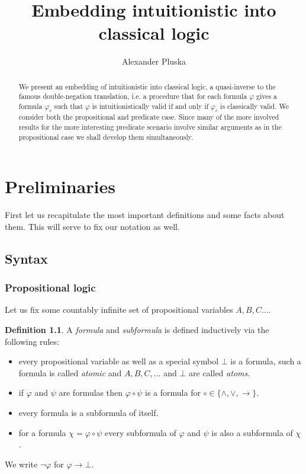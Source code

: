 \documentclass[a4paper,12pt]{report}
\title{Embedding intuitionistic into classical logic}
\author{Alexander Pluska}
\theoremstyle{definition}
\theoremstyle{definition}
\theoremstyle{definition}
\theoremstyle{definition}
\theoremstyle{definition}
\newtheorem{definition}[theorem]{Definition}
\theoremstyle{definition}
\theoremstyle{definition}
\begin{document}
	
	\maketitle
	
	\begin{abstract}
		We present an embedding of intuitionistic into classical logic, a quasi-inverse to the famous double-negation translation, i.e. a procedure that for each formula $\varphi$ gives a formula $\varphi_c$ such that $\varphi$ is intuitionistically valid if and only if $\varphi_c$ is classically valid. We consider both the propositional and predicate case. Since many of the more involved results for the more interesting predicate scenario involve similar arguments as in the propositional case we shall develop them simultaneously.
	\end{abstract}
	
	\tableofcontents

	\chapter{Preliminaries}

	First let us recapitulate the most important definitions and some facts about them. This will serve to fix our notation as well.
	
	\section{Syntax}
	
	\subsection{Propositional logic}
	
	Let us fix some countably infinite set of propositional variables $A, B, C\dots$.
	
	\begin{definition}
		A \textit{formula} and \textit{subformula} is defined inductively via the following rules:
		\begin{itemize}
			\item every propositional variable as well as a special symbol $\bot$ is a formula, such a formula is called \textit{atomic} and $A,B,C,\dots$ and $\bot$ are called \textit{atoms}.
			\item if $\varphi$ and $\psi$ are formulas then $\varphi\circ\psi$ is a formula for $\circ\in\{\wedge,\vee,\to\}$.
			\item every formula is a subformula of itself.
			\item for a formula $\chi = \varphi\circ\psi$ every subformula of $\varphi$ and $\psi$ is also a subformula of $\chi$.
		\end{itemize}
	We write $\neg \varphi$ for $\varphi\to \bot$.
	\end{definition}
\end{document}
